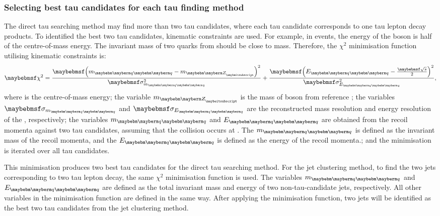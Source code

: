\subsubsection{Selecting best tau candidates for each tau finding method}

The direct tau searching method may find more than two tau  candidates, where each tau candidate corresponds to one tau lepton decay products. To identified the best two tau candidates, kinematic constraints are used.  For example, in  \HepProcess{\Pep \Pem \to \PZ \PZ} events, the energy of the \PZ boson is half of the centre-of-mass energy. The invariant mass of two quarks from \PZ should be close to \PZ mass. Therefore, the $\chi^2$ minimisation function utilising kinematic constraints is:
\begin{equation}
\chi^2 = \frac{\parenths{m_{\Pquark\Pquark} - m_{\PZ}}^2}{\sigma_{m_{\Pquark\Pquark}}^2} + \frac{\parenths{E_{\Pquark\Pquark} - \frac{\sqrtS}{2}}^2}{\sigma_{E_{\Pquark\Pquark}}^2},
\label{eq:tauMinimiser}
\end{equation}
where \sqrtS is the centre-of-mass energy; the variable $m_{\PZ}$ is the mass of \PZ boson from reference \cite{Agashe:2014kda}; the variables $\sigma_{m_{\Pquark\Pquark}}$ and $\sigma_{E_{\Pquark\Pquark}}$ are the reconstructed mass resolution  and energy resolution of the \ZToqq, respectively;  the variables $m_{\Pquark\Pquark}$ and  $E_{\Pquark\Pquark}$ are obtained from the recoil momenta against two tau candidates, assuming that the collision occurs at \sqrtS. The  $m_{\Pquark\Pquark}$ is defined as the invariant mass of the recoil momenta, and  the $E_{\Pquark\Pquark}$ is defined as the energy of the recoil momenta.; and the minimisation is iterated over all tau candidates.

This minimisation produces two best tau candidates for the direct tau searching method. For the jet clustering method, to find the two jets corresponding to two tau lepton decay, the same $\chi^2$ minimisation function is used.  The variables $m_{\Pquark\Pquark}$ and  $E_{\Pquark\Pquark}$ are defined as the total invariant mass and energy of two non-tau-candidate jets, respectively. All other variables in the minimisation function are defined in the same way. After applying the minimisation function, two jets will be identified as the best two tau candidates from the jet clustering method. 



